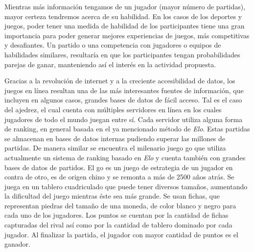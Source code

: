\documentclass[11pt,twoside,spanish]{report} %
\begin{document}
Mientras m\'as informaci\'on tengamos de un jugador (mayor n\'umero de partidas), mayor certeza tendremos acerca de su habilidad.
En los casos de los deportes y juegos, poder tener una medida de habilidad de los participantes tiene una gran importancia para poder generar mejores experiencias de juegos, m\'as competitivas y desafiantes.
Un partido o una competencia con jugadores o equipos de habilidades similares, resultar\'ia en que los participantes tengan probabilidades parejas de ganar, manteniendo as\'i el inter\'es en la actividad propuesta.

Gracias a la revoluci\'on de internet y a la creciente accesibilidad de datos, los juegos en l\'inea resultan una de las m\'as interesantes fuentes de informaci\'on, que incluyen en algunos casos, grandes bases de datos de f\'acil acceso.
Tal es el caso del ajedrez, el cual cuenta con m\'ultiples servidores en l\'inea en los cuales jugadores de todo el mundo juegan entre s\'i.
Cada servidor utiliza alguna forma de ranking, en general basada en el ya mencionado m\'etodo de \textit{Elo}.
Estas partidas se almacenan en bases de datos internas pudiendo superar las millones de partidas.
De manera similar se encuentra el milenario juego go que utiliza actualmente un sistema de ranking basado en \textit{Elo} y cuenta tambi\'en con grandes bases de datos de partidos.
El go es un juego de estrategia de un jugador en contra de otro, es de origen chino y se remonta a m\'as de 2500 a\~nos atr\'as.
Se juega en un tablero cuadriculado que puede tener diversos tama\~nos, aumentando la dificultad del juego mientras \'este sea m\'as grande.
Se usan fichas, que representan piedras del tama\~no de una moneda, de color blanco y negro para cada uno de los jugadores.
Los puntos se cuentan por la cantidad de fichas capturadas del rival as\'i como por la cantidad de tablero dominado por cada jugador.
Al finalizar la partida, el jugador con mayor cantidad de puntos es el ganador.
\end{document}
